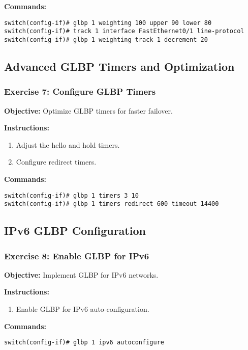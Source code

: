 \documentclass[12pt]{article}
\begin{document}
\textbf{Commands:}
\begin{lstlisting}[style=CiscoCLI]
switch(config-if)# glbp 1 weighting 100 upper 90 lower 80
switch(config-if)# track 1 interface FastEthernet0/1 line-protocol
switch(config-if)# glbp 1 weighting track 1 decrement 20
\end{lstlisting}

\bigskip

\subsection{Advanced GLBP Timers and Optimization}

\subsubsection*{Exercise 7: Configure GLBP Timers}
\textbf{Objective:} Optimize GLBP timers for faster failover.

\textbf{Instructions:}
\begin{enumerate}
\item Adjust the hello and hold timers.
\item Configure redirect timers.
\end{enumerate}

\textbf{Commands:}
\begin{lstlisting}[style=CiscoCLI]
switch(config-if)# glbp 1 timers 3 10
switch(config-if)# glbp 1 timers redirect 600 timeout 14400
\end{lstlisting}

\bigskip

\subsection{IPv6 GLBP Configuration}

\subsubsection*{Exercise 8: Enable GLBP for IPv6}
\textbf{Objective:} Implement GLBP for IPv6 networks.

\textbf{Instructions:}
\begin{enumerate}
\item Enable GLBP for IPv6 auto-configuration.
\end{enumerate}

\textbf{Commands:}
\begin{lstlisting}[style=CiscoCLI]
switch(config-if)# glbp 1 ipv6 autoconfigure
\end{lstlisting}
\end{document}
